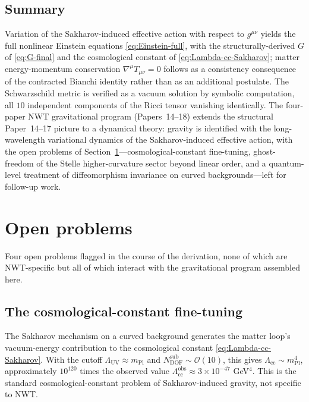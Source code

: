 \documentclass[11pt]{article}
\newcommand{\mPl}{m_{\mathrm{Pl}}}
\begin{document}
\subsection{Summary}

Variation of the Sakharov-induced effective action with respect to
$g^{\mu\nu}$ yields the full nonlinear Einstein equations
\eqref{eq:Einstein-full}, with the structurally-derived $G$ of
\eqref{eq:G-final} and the cosmological constant of
\eqref{eq:Lambda-cc-Sakharov}; matter energy-momentum conservation
$\nabla^\mu T_{\mu\nu} = 0$ follows as a consistency consequence
of the contracted Bianchi identity rather than as an additional
postulate.  The Schwarzschild metric is verified as a vacuum
solution by symbolic computation, all $10$ independent components
of the Ricci tensor vanishing identically.  The four-paper NWT
gravitational program (Papers~14--18) extends the structural
Paper~14--17 picture to a dynamical theory: gravity is identified
with the long-wavelength variational dynamics of the
Sakharov-induced effective action, with the open problems of
Section~\ref{sec:open}---cosmological-constant fine-tuning,
ghost-freedom of the Stelle higher-curvature sector beyond linear
order, and a quantum-level treatment of diffeomorphism invariance
on curved backgrounds---left for follow-up work.

\section{Open problems}
\label{sec:open}

Four open problems flagged in the course of the derivation, none
of which are NWT-specific but all of which interact with the
gravitational program assembled here.

\subsection{The cosmological-constant fine-tuning}

The Sakharov mechanism on a curved background generates the matter
loop's vacuum-energy contribution to the cosmological constant
\eqref{eq:Lambda-cc-Sakharov}.  With the cutoff
$\Lambda_{\mathrm{UV}} \approx \mPl$ and
$N_{\mathrm{DOF}}^{\mathrm{sub}} \sim \mathcal{O}(10)$, this gives
$\Lambda_{\mathrm{cc}} \sim \mPl^4$, approximately $10^{120}$ times
the observed value
$\Lambda_{\mathrm{cc}}^{\mathrm{obs}} \approx 3 \times 10^{-47}$
GeV$^4$.  This is the standard cosmological-constant problem of
Sakharov-induced gravity, not specific to NWT.
\end{document}
